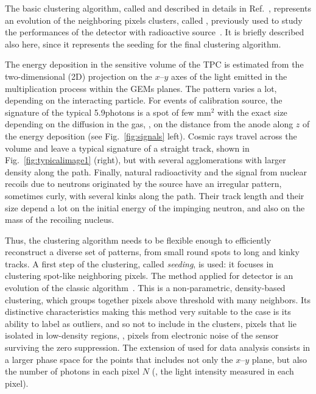 The basic clustering algorithm, called \idbscan and  described in 
details in Ref.~\cite{iDBSCAN}, represents an evolution of the
neighboring pixels clusters, called \nnc, previously used to study the
performances of the \lemon detector with \fe radioactive
source~\cite{bib:fe55}. It is briefly described also here, since it
represents the seeding for the final clustering algorithm.

The energy deposition in the sensitive volume of the TPC is estimated
from the two-dimensional (2D) projection on the $x$--$y$ axes of the
light emitted in the multiplication process within the GEMs
planes. The pattern varies a lot, depending on the interacting
particle. For events of \fe calibration source, the signature of the
typical 5.9\keV photons is a spot of few mm$^2$ with the exact size
depending on the diffusion in the gas, \ie, on the distance from the
anode along $z$ of the energy deposition (see Fig.~\ref{fig:signals}
left). Cosmic rays travel across the volume and leave a typical
signature of a straight track, shown in Fig.~\ref{fig:typicalimage1}
(right), but with several agglomerations with larger density along the
path. Finally, natural radioactivity and the signal from nuclear
recoils due to neutrons originated by the \ambe source have an
irregular pattern, sometimes curly, with several kinks along the
path. Their track length and their size depend a lot on the initial
energy of the impinging neutron, and also on the mass of the recoiling
nucleus.

Thus, the clustering algorithm needs to be flexible enough to
efficiently reconstruct a diverse set of patterns, from small round
spots to long and kinky tracks. A first step of the clustering,
called \textit{seeding}, is used: it focuses in clustering spot-like
neighboring pixels.  The method applied for \lemon detector is an
evolution of the classic \dbscan algorithm~\cite{dbscan}.  This is a
non-parametric, density-based clustering, which groups together pixels
above threshold with many neighbors. Its distinctive characteristics
making this method very suitable to the \lemon case is its ability to
label as outliers, and so not to include in the clusters, pixels that
lie isolated in low-density regions, \ie, pixels from electronic noise
of the sensor surviving the zero suppression. The extension of \dbscan
used for \lemon data analysis consists in a larger phase space for the
points that includes not only the $x$--$y$ plane, but also the number
of photons in each pixel $N$ (\ie, the light intensity measured in
each pixel).

